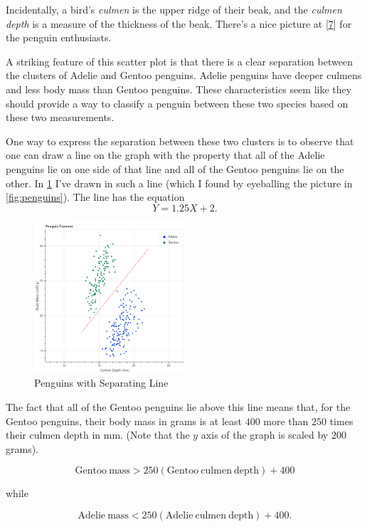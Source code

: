 \documentclass[
  oneside]{scrbook}
\begin{document}
Incidentally, a bird's \emph{culmen} is the upper ridge of their beak,
and the \emph{culmen depth} is a measure of the thickness of the beak.
There's a nice picture at {[}\protect\hyperlink{ref-penguindata}{7}{]}
for the penguin enthusiasts.

A striking feature of this scatter plot is that there is a clear
separation between the clusters of Adelie and Gentoo penguins. Adelie
penguins have deeper culmens and less body mass than Gentoo penguins.
These characteristics seem like they should provide a way to classify a
penguin between these two species based on these two measurements.

One way to express the separation between these two clusters is to
observe that one can draw a line on the graph with the property that all
of the Adelie penguins lie on one side of that line and all of the
Gentoo penguins lie on the other. In \cref{fig:penguinsline} I've drawn
in such a line (which I found by eyeballing the picture in
\cref{fig:penguins}). The line has the equation \[
Y = 1.25X+2.
\]

\begin{figure}
\hypertarget{fig:penguinsline}{%
\centering
\includegraphics[width=0.5\textwidth,height=\textheight]{img/penguins_with_line.png}
\caption{Penguins with Separating Line}\label{fig:penguinsline}
}
\end{figure}

The fact that all of the Gentoo penguins lie above this line means that,
for the Gentoo penguins, their body mass in grams is at least \(400\)
more than \(250\) times their culmen depth in mm. (Note that the \(y\)
axis of the graph is scaled by \(200\) grams).

\[
\mathrm{Gentoo\ mass}> 250(\mathrm{Gentoo\ culmen\ depth})+400
\]

while

\[
\mathrm{Adelie\ mass}<250(\mathrm{Adelie\ culmen\ depth})+400.
\]
\end{document}
